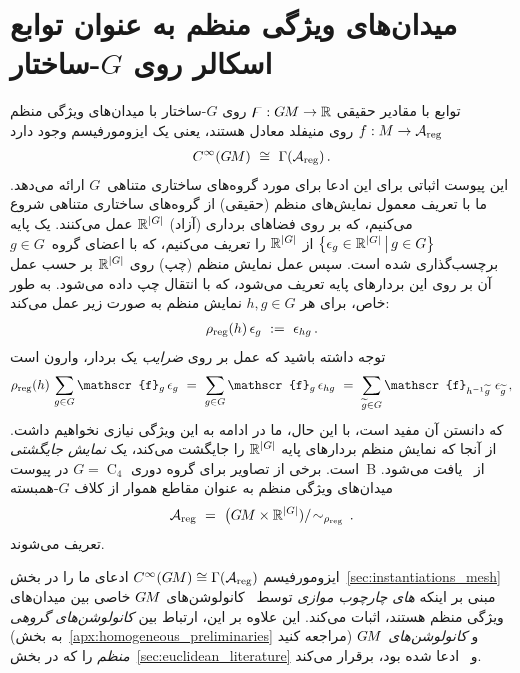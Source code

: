 

\section{میدان‌های ویژگی منظم به عنوان توابع اسکالر روی $G$-ساختار}
\label{apx:regular_field_scalar_GM}


توابع با مقادیر حقیقی $\digamma: G\mkern-1.4muM \to \mathbb{R}$ روی $G$-ساختار با میدان‌های ویژگی منظم $f: M \to \mathcal{A}_{\textup{reg}}$ روی منیفلد معادل هستند، یعنی یک ایزومورفیسم وجود دارد
\begin{align}
    C^\infty(G\mkern-1.4muM)\ \cong\ \Gamma(\mathcal{A}_{\textup{reg}}) \,.
\end{align}
این پیوست اثباتی برای این ادعا برای مورد گروه‌های ساختاری متناهی~$G$ ارائه می‌دهد.
ما با تعریف معمول نمایش‌های منظم (حقیقی) از گروه‌های ساختاری متناهی شروع می‌کنیم، که بر روی فضاهای برداری (آزاد) $\mathbb{R}^{|G|}$ عمل می‌کنند.
یک پایه $\big\{ \epsilon_g \in \mathbb{R}^{|G|} \,\big|\, g\in G \big\}$ از $\mathbb{R}^{|G|}$ را تعریف می‌کنیم، که با اعضای گروه~$g\in G$ برچسب‌گذاری شده است.
سپس عمل نمایش منظم (چپ) روی $\mathbb{R}^{|G|}$ بر حسب عمل آن بر روی این بردارهای پایه تعریف می‌شود، که با انتقال چپ داده می‌شود.
به طور خاص، برای هر $h,g\in G$ نمایش منظم به صورت زیر عمل می‌کند:
\begin{align}\label{eq:finite_regular_rep_action}
    \rho_{\textup{reg}}(h)\, \epsilon_g\ :=\ \epsilon_{hg} \,.
\end{align}
توجه داشته باشید که عمل بر روی \emph{ضرایب} یک بردار، وارون است
\begin{align}\label{eq:finite_regular_rep_action_coeffs}
    \rho_{\textup{reg}}(h)\, \sum_{g\in G} \mathscr{f}_g\, \epsilon_g
    \ =\ \sum_{g\in G} \mathscr{f}_g\, \epsilon_{hg}
    \ =\ \sum_{{\widetilde{g}}\in G} \mathscr{f}_{h^{-1}\widetilde{g}}\ \epsilon_{\widetilde{g}} \,,
\end{align}
که دانستن آن مفید است، با این حال، ما در ادامه به این ویژگی نیازی نخواهیم داشت.
از آنجا که نمایش منظم بردارهای پایه $\mathbb{R}^{|G|}$ را جایگشت می‌کند، یک \emph{نمایش جایگشتی} است.
برخی از تصاویر برای گروه دوری $G=\operatorname{C}_4$ در پیوست~B از~\cite{Weiler2019_E2CNN} یافت می‌شود.
میدان‌های ویژگی منظم به عنوان مقاطع هموار از کلاف $G$-همبسته
\begin{align}
    \mathcal{A}_{\textup{reg}}\ =\ \big(G\mkern-1.4muM \times \mathbb{R}^{|G|}) /\! \sim_{\rho_\textup{reg}} \,.
\end{align}
تعریف می‌شوند.


ایزومورفیسم $C^\infty(G\mkern-1.4muM) \cong \Gamma(\mathcal{A}_{\textup{reg}})$ ادعای ما را در بخش~\ref{sec:instantiations_mesh} مبنی بر اینکه \emph{های چارچوب موازی} توسط~\citet{Yang2020parallelFrameCNN} کانولوشن‌های $G\mkern-1.4muM$ خاصی بین میدان‌های ویژگی منظم هستند، اثبات می‌کند.
این علاوه بر این، ارتباط بین \emph{کانولوشن‌های گروهی} (به بخش~\ref{apx:homogeneous_preliminaries} مراجعه کنید) و \emph{کانولوشن‌های $G\mkern-1.4muM$ منظم} را که در بخش~\ref{sec:euclidean_literature} و~\cite{Weiler2019_E2CNN} ادعا شده بود، برقرار می‌کند.


